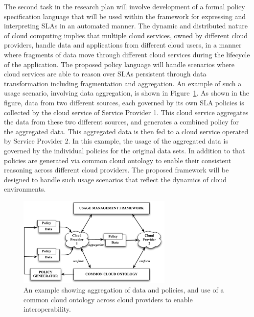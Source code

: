 \documentclass[10pt, conference, compsoc]{IEEEtran}
\begin{document}
The second task in the research plan will involve development of a formal policy specification language that will be used within the framework for expressing and interpreting SLAs in an automated manner.  The dynamic and distributed nature of cloud computing implies that multiple cloud services, owned by different cloud providers, handle data and applications from different cloud users, in a manner where fragments of data move through different cloud services during the lifecycle of the application. The proposed policy language will handle scenarios where cloud services are able to reason over SLAs persistent through data transformation including fragmentation and aggregation. An example of such a usage scenario, involving data aggregation, is shown in Figure~\ref{fig:dynamics}. As shown in the figure, data from two different sources, each governed by its own SLA  policies is collected by the cloud service of  Service Provider 1. This cloud service aggregates the data from these two different sources, and generates a combined policy for the aggregated data. This aggregated data is then fed to a cloud service operated by Service Provider 2. In this example, the usage of the aggregated data is governed by the individual policies for the original data sets. In addition to that policies are generated via common cloud ontology to enable their consistent reasoning across different cloud providers. The proposed framework will be designed to handle such usage scenarios that reflect the dynamics of cloud environments. 

\begin{figure}[!t]
\centering
\includegraphics[width=3in]{dynamics.pdf}
\caption{An example showing aggregation of data and policies, and use of a common cloud ontology across cloud providers to enable interoperability.}
\label{fig:dynamics}
\end{figure}
\end{document}
